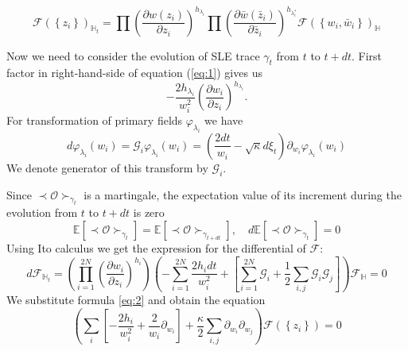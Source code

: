 \documentclass[a4paper]{jpconf}
\theoremstyle{definition}
\theoremstyle{definition} \newtheorem{Def}{Definition}
\begin{document}
\begin{equation}
  \mathcal{F}(\left\{z_{i}\right\})_{\mathbb{H}_{t}}=\prod \left(\frac{\partial w(z_{i})}{\partial z_{i}}\right)^{h_{\lambda_i}} 
  \prod \left(\frac{\partial \bar w(\bar z_{i})}{\partial \bar z_{i}}\right)^{h_{\lambda^{*}_i}}
  \mathcal{F}(\left\{w_{i}, \bar w_{i}\right\})_{\mathbb{H}}
  \label{eq:1}
\end{equation}

Now we need to consider the evolution of SLE trace $\gamma_{t}$ from  $t$ to $t+ dt$. First factor in right-hand-side of equation (\ref{eq:1}) gives us
\begin{equation*}
  -\frac{2h_{\lambda_{i}}}{w_{i}^{2}}\left(\frac{\partial w_{i}}{\partial z_{i}}\right)^{h_{\lambda_{i}}}.
\end{equation*}
For transformation of primary fields $\varphi_{\lambda_{i}}$ we have 
\begin{equation}
  \label{eq:2}
  d\varphi_{\lambda_{i}}(w_{i}) = \mathcal{G}_{i}\varphi_{\lambda_{i}}(w_{i})=\left(\frac{2dt}{w_{i}}-\sqrt{\kappa} d\xi_{t}\right) \partial_{w_{i}}\varphi_{\lambda_{i}}(w_{i}) 
\end{equation}
We denote generator of this transform by $\mathcal{G}_{i}$.

Since $ \prec\mathcal{O}\succ_{\gamma_{t}}$ is a martingale, the expectation value of its increment during the evolution from $t$ to $t+dt$ is zero
\begin{equation}
  \mathbb{E}\left[\prec\mathcal{O}\succ_{\gamma_{t}}\right]=    \mathbb{E}\left[\prec\mathcal{O}\succ_{\gamma_{t+dt}}\right], \quad d\mathbb{E}\left[ \prec\mathcal{O}\succ_{\gamma_{t}}\right]=0
\label{eq:22}
\end{equation}
Using Ito calculus we get the expression for the differential of $\mathcal{F}$:
\begin{equation}
d \mathcal{F}_{\mathbb{H}_{t}}= \left(\prod_{i=1}^{2N}\left(\frac{\partial w_{i}}{\partial z_{i}}\right)^{h_{i}}\right)\left(-\sum_{i=1}^{2N}\frac{2h_{i}dt}{w_{i}^{2}}+\left[\sum_{i=1}^{2N}\mathcal{G}_{i}+\frac{1}{2}
      \sum_{i,j}\mathcal{G}_{i}\mathcal{G}_{j}\right]\right)\mathcal{F}_{\mathbb{H}}=0
\label{eq:8}
\end{equation}
We substitute formula \eqref{eq:2} and obtain the equation
\begin{equation}
  \left( \sum_{i}\left[-\frac{2h_{i}}{w_{i}^{2}} +\frac{2}{w_{i}}\partial_{w_{i}}\right]+\frac{\kappa}{2}\sum_{i,j}\partial_{w_{i}} \partial_{w_{j}}\right)\mathcal{F}(\left\{z_{i}\right\})=0
\label{eq:23}
\end{equation}
\end{document}
